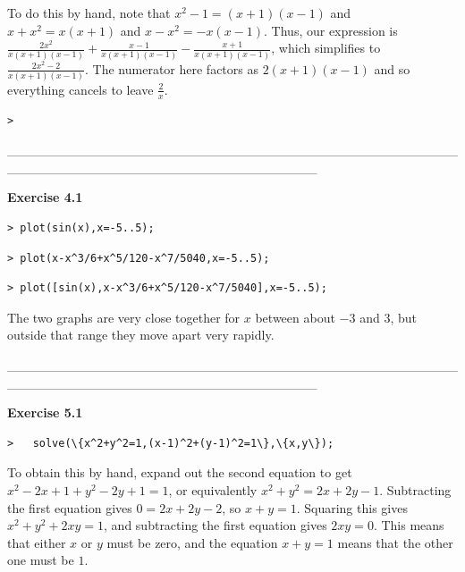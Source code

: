 \documentclass{article}
\begin{document}
\begin{Maple Normal}
To do this by hand, note that 
$ x^{2}-1=(x +1)(x -1) $ and 
$ x +x^{2}=x (x +1) $ and 
$ x -x^{2}=-x (x -1) $.  Thus, our expression is 
$ \frac{2 x^{2}}{x (x +1) (x -1)}+\frac{x -1}{x (x +1) (x -1)}-\frac{x +1}{x (x +1) (x -1)} $, which simplifies to 
$ \frac{2 x^{2}-2}{x (x +1) (x -1)} $.  The numerator here factors as 
$ 2 (x +1) (x -1) $ and so everything cancels to leave 
$ \frac{2}{x} $.
\end{Maple Normal}
\begin{lstlisting}
> 
\end{lstlisting}
\begin{Maple Normal}
\_\_\_\_\_\_\_\_\_\_\_\_\_\_\_\_\_\_\_\_\_\_\_\_\_\_\_\_\_\_\_\_\_\_\_\_\_\_\_\_\_\_\_\_\_\_\_\_\_\_\_\_\_\_\_\_\_\_\_\_\_\_\_\_\_\_\_\_\_\_\_\_\_\_\_\_\_\_\_\_\_
\end{Maple Normal}
\begin{Maple Heading 2}
\textbf{Exercise 4.1}
\end{Maple Heading 2}
\begin{lstlisting}
> plot(sin(x),x=-5..5);
\end{lstlisting}
\begin{lstlisting}
> plot(x-x^3/6+x^5/120-x^7/5040,x=-5..5);
\end{lstlisting}
\begin{lstlisting}
> plot([sin(x),x-x^3/6+x^5/120-x^7/5040],x=-5..5);
\end{lstlisting}
\begin{Maple Normal}
The two graphs are very close together for 
$ x  $ between about 
$ -3 $ and 
$ 3 $, but outside that range they move apart very rapidly.
\end{Maple Normal}
\begin{Maple Normal}
\_\_\_\_\_\_\_\_\_\_\_\_\_\_\_\_\_\_\_\_\_\_\_\_\_\_\_\_\_\_\_\_\_\_\_\_\_\_\_\_\_\_\_\_\_\_\_\_\_\_\_\_\_\_\_\_\_\_\_\_\_\_\_\_\_\_\_\_\_\_\_\_\_\_\_\_\_\_\_\_\_
\end{Maple Normal}
\begin{Maple Heading 2}
\textbf{Exercise 5.1}
\end{Maple Heading 2}
\begin{lstlisting}
>   solve(\{x^2+y^2=1,(x-1)^2+(y-1)^2=1\},\{x,y\});
\end{lstlisting}
\begin{Maple Normal}
To obtain this by hand, expand out the second equation to get 
$ x^{2}-2 x +1+y^{2}-2 y +1=1 $, or equivalently 
$ x^{2}+y^{2}=2 x +2 y -1 $.  Subtracting the first equation gives 
$ 0=2 x +2 y -2 $, so 
$ x +y =1 $.  Squaring this gives 
$ x^{2}+y^{2}+2 x y =1 $, and subtracting the first equation gives 
$ 2 x y =0 $.  This means that either 
$ x  $ or 
$ y  $ must be zero, and the equation 
$ x +y =1 $ means that the other one must be 
$ 1 $.
\end{Maple Normal}
\end{document}
